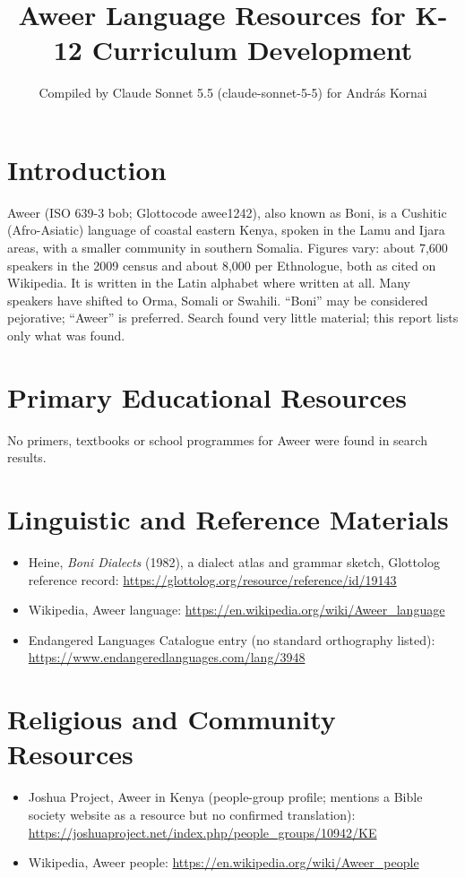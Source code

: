 \documentclass[12pt]{article}
\title{Aweer Language Resources for K-12 Curriculum Development}
\author{Compiled by Claude Sonnet 5.5 (claude-sonnet-5-5) for Andr\'as Kornai}
\date{}
\begin{document}
\maketitle

\section{Introduction}
Aweer (ISO 639-3 bob; Glottocode awee1242), also known as Boni, is a Cushitic (Afro-Asiatic) language of coastal eastern Kenya, spoken in the Lamu and Ijara areas, with a smaller community in southern Somalia. Figures vary: about 7,600 speakers in the 2009 census and about 8,000 per Ethnologue, both as cited on Wikipedia. It is written in the Latin alphabet where written at all. Many speakers have shifted to Orma, Somali or Swahili. ``Boni'' may be considered pejorative; ``Aweer'' is preferred. Search found very little material; this report lists only what was found.

\section{Primary Educational Resources}
No primers, textbooks or school programmes for Aweer were found in search results.

\section{Linguistic and Reference Materials}
\begin{itemize}
\item Heine, \emph{Boni Dialects} (1982), a dialect atlas and grammar sketch, Glottolog reference record: \url{https://glottolog.org/resource/reference/id/19143}
\item Wikipedia, Aweer language: \url{https://en.wikipedia.org/wiki/Aweer_language}
\item Endangered Languages Catalogue entry (no standard orthography listed): \url{https://www.endangeredlanguages.com/lang/3948}
\end{itemize}

\section{Religious and Community Resources}
\begin{itemize}
\item Joshua Project, Aweer in Kenya (people-group profile; mentions a Bible society website as a resource but no confirmed translation): \url{https://joshuaproject.net/index.php/people_groups/10942/KE}
\item Wikipedia, Aweer people: \url{https://en.wikipedia.org/wiki/Aweer_people}
\end{itemize}
\end{document}
